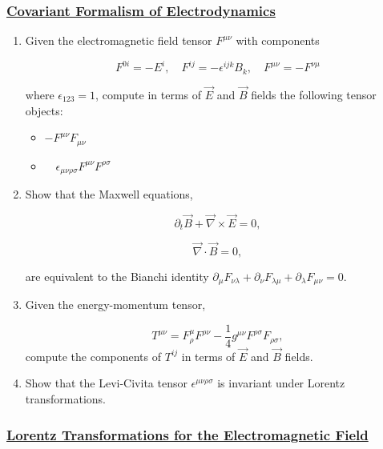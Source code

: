 \subsubsection{\hyperref[Covariant formalism of Electrodynamics]{Covariant Formalism of Electrodynamics}}

\begin{enumerate}
	\item Given the electromagnetic field tensor $F^{\mu \nu}$ with components
	
	\begin{equation}
	F^{0 i}=-E^{i}, \quad F^{i j}=-\epsilon^{i j k} B_{k}, \quad F^{\mu \nu}=-F^{\nu \mu}
	\end{equation}

	where $\epsilon_{123}=1$, compute in terms of $\vec{E}$ and $\vec{B}$ fields the following tensor objects:

	\begin{itemize}
		\item $-F^{\mu \nu} F_{\mu \nu}$
		\item $\quad \epsilon_{\mu \nu \rho \sigma} F^{\mu \nu} F^{\rho \sigma}$
	\end{itemize}

	\item Show that the Maxwell equations,
	
	\begin{equation}
		\partial_{t}\vec{B} + \vec{\nabla}\times \vec{E}=0,
	\end{equation}

	\begin{equation}
		\vec{\nabla}\cdot \vec{B}=0,
	\end{equation}

	are equivalent to the Bianchi identity $\partial_{\mu} F_{\nu\lambda} + \partial_{\nu} F_{\lambda\mu} +\partial_{\lambda} F_{\mu\nu}=0$.
	\item Given the energy-momentum tensor,
	
	\begin{equation}
		T^{\mu\nu}= F^{\mu}_{\rho}F^{\rho \nu} - \frac{1}{4}g^{\mu\nu}F^{\rho\sigma}F_{\rho\sigma},
	\end{equation}
	compute the components of $T^{ij}$ in terms of $\vec{E}$ and $\vec{B}$ fields.
	\item Show that the Levi-Civita tensor $\epsilon^{\mu \nu \rho \sigma}$ is invariant under Lorentz transformations.
\end{enumerate}

\subsubsection{\hyperref[Lorentz Transformations for the Electromagnetic Field]{Lorentz Transformations for the Electromagnetic Field}}

